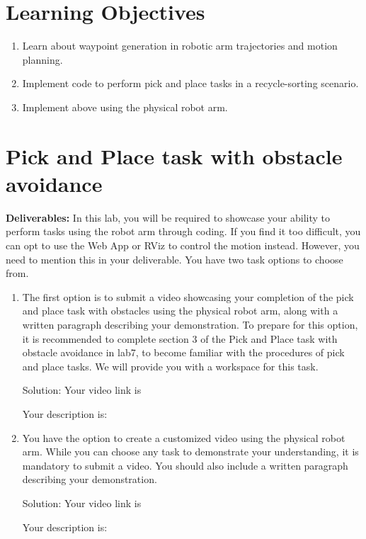 \documentclass[12pt]{article}
\begin{document}
	\MakeScribeTop


\section{Learning Objectives}
\begin{enumerate}
    \item Learn about waypoint generation in robotic arm trajectories and motion planning.
    
    \item Implement code to perform pick and place tasks in a recycle-sorting scenario.
    
    \item Implement above using the physical robot arm. 
    
\end{enumerate}


\section{Pick and Place task with obstacle avoidance}
\textbf{Deliverables:}
In this lab, you will be required to showcase your ability to perform tasks using the robot arm through coding. If you find it too difficult, you can opt to use the Web App or RViz to control the motion instead. However, you need to mention this in your deliverable. You have two task options to choose from.
\begin{enumerate}
    
    \item The first option is to submit a video showcasing your completion of the pick and place task with obstacles using the physical robot arm, along with a written paragraph describing your demonstration. To prepare for this option, it is recommended to complete section 3 of the Pick and Place task with obstacle avoidance in lab7, to become familiar with the procedures of pick and place tasks. We will provide you with a workspace for this task.
    
    Solution:
    Your video link is
    
    Your description is:
    
    \item You have the option to create a customized video using the physical robot arm. While you can choose any task to demonstrate your understanding, it is mandatory to submit a video. You should also include a written paragraph describing your demonstration. 
    
    Solution:
    Your video link is
    
    Your description is:
    
\end{enumerate}
\end{document}
